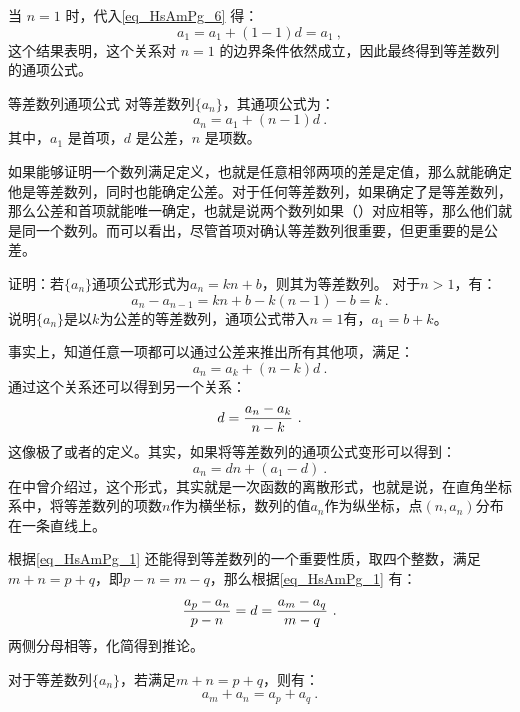 当  $n = 1$  时，代入\autoref{eq_HsAmPg_6} 得：
\begin{equation}
a_1 = a_1 + (1 - 1)d = a_1~,
\end{equation}
这个结果表明，这个关系对 $n = 1$ 的边界条件依然成立，因此最终得到等差数列的通项公式。
\begin{corollary}{等差数列通项公式}
对等差数列$\{a_n\}$，其通项公式为：
\begin{equation}\label{eq_HsAmPg_5}
a_n = a_1 + (n - 1)d~.
\end{equation}
其中，$a_1$ 是首项，$d$ 是公差，$n$ 是项数。
\end{corollary}
如果能够证明一个数列满足定义，也就是任意相邻两项的差是定值，那么就能确定他是等差数列，同时也能确定公差。对于任何等差数列，如果确定了是等差数列，那么公差和首项就能唯一确定，也就是说两个数列如果（）对应相等，那么他们就是同一个数列。而可以看出，尽管首项对确认等差数列很重要，但更重要的是公差。
\begin{example}{证明：若$\{a_n\}$通项公式形式为$a_n=kn+b$，则其为等差数列。}
对于$n>1$，有：
\begin{equation}
a_n-a_{n-1}=kn+b-k(n-1)-b=k~.
\end{equation}
说明$\{a_n\}$是以$k$为公差的等差数列，通项公式带入$n=1$有，$a_1=b+k$。
\end{example}

事实上，知道任意一项都可以通过公差来推出所有其他项，满足：
\begin{equation}
a_n=a_k+(n-k)d~.
\end{equation}
通过这个关系还可以得到另一个关系：
\begin{equation}\label{eq_HsAmPg_1}
d={a_n-a_k\over n-k}~.
\end{equation}
这像极了或者的定义。其实，如果将等差数列的通项公式变形可以得到：
\begin{equation}
a_n=dn+(a_1-d)~.
\end{equation}
在中曾介绍过，这个形式，其实就是一次函数的离散形式，也就是说，在直角坐标系中，将等差数列的项数$n$作为横坐标，数列的值$a_n$作为纵坐标，点$(n,a_n)$分布在一条直线上。


根据\autoref{eq_HsAmPg_1} 还能得到等差数列的一个重要性质，取四个整数，满足$m+n=p+q$，即$p-n=m-q$，那么根据\autoref{eq_HsAmPg_1} 有：
\begin{equation}
{a_p-a_n\over p-n}=d={a_m-a_q\over m-q}~.
\end{equation}
两侧分母相等，化简得到推论。
\begin{corollary}{}\label{cor_HsAmPg_1}
对于等差数列$\{a_n\}$，若满足$m+n=p+q$，则有：
\begin{equation}
a_m+a_n=a_p+a_q~.
\end{equation}
\end{corollary}


